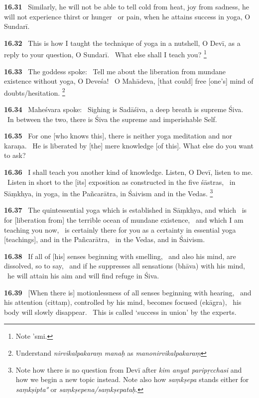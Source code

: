 \documentclass{article}
\newcommand{\skt}[1]{\textit{#1}}
\begin{document}
\textbf{16.31}%
\ Similarly, he will not be able to tell cold from heat, joy from sadness, he will not experience thirst or hunger%
\  or pain, when he attains success in yoga, O Sundarī.%


\textbf{16.32}%
\ This is how I taught the technique of yoga in a nutshell, O Devī, as a reply to your question, O Sundarī.%
\ What else shall I teach you?%
\footnote{Note 'smi. }%


\textbf{16.33}%
\ The goddess spoke:%
\ Tell me about the liberation from mundane existence without yoga, O Deveśa!%
\ O Mahādeva, [that could] free [one's] mind of doubts/hesitation.%
\footnote{Understand \skt{nirvikalpakaraṃ manaḥ} as \skt{manonirvikalpakaraṃ} }%


\textbf{16.34}%
\ Maheśvara spoke:%
\ Sighing is Sadāśiva, a deep breath is supreme Śiva.%
\ In between the two, there is Śiva the supreme and imperishable Self.%


\textbf{16.35}%
\ For one [who knows this], there is neither yoga meditation and nor karaṇa.%
\ He is liberated by [the] mere knowledge [of this]. What else do you want to ask?%


\textbf{16.36}%
\ I shall teach you another kind of knowledge. Listen, O Devī, listen to me.%
\ Listen in short to the [its] exposition as constructed in the five śāstras,%
\ in Sāṃkhya, in yoga, in the Pañcarātra, in Śaivism and in the Vedas.%
\footnote{Note how there is no question from Devī after \skt{kim anyat paripṛcchasi} and how we begin a new topic instead.                Note also how \skt{saṃkṣepa} stands either for \skt{saṃkṣipta°} or \skt{saṃkṣepena/saṃkṣepataḥ}. }%


\textbf{16.37}%
\ The quintessential yoga which is established in Sāṃkhya, and which%
\                 is for [liberation from] the terrible ocean of mundane existence,%
\ and which I am teaching you now,%
\ is certainly there for you as a certainty in essential yoga [teachings], and in the Pañcarātra,%
\ in the Vedas, and in Śaivism.%


\textbf{16.38}%
\ If all of [his] senses beginning with smelling,%
\ and also his mind, are dissolved, so to say,%
\ and if he suppresses all sensations (bhāva) with his mind,%
\ he will attain his aim and will find refuge in Śiva.%


\textbf{16.39}%
\ [When there is] motionlessness of all senses beginning with hearing,%
\ and his attention (cittaṃ), controlled by his mind, becomes focused (ekāgra),%
\ his body will slowly disappear.%
\ This is called `success in union' by the experts.%
\end{document}
